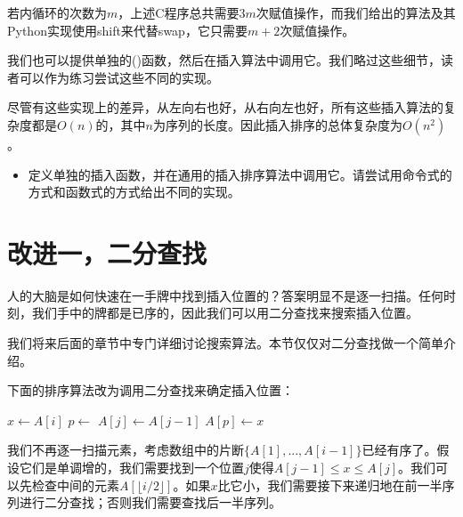 \documentclass[UTF8]{article}
\begin{document}
若内循环的次数为$m$，上述C程序总共需要$3m$次赋值操作，而我们给出的算法及其Python实现使用shift来代替swap，它只需要$m+2$次赋值操作。

我们也可以提供单独的()函数，然后在插入算法中调用它。我们略过这些细节，读者可以作为练习尝试这些不同的实现。

尽管有这些实现上的差异，从左向右也好，从右向左也好，所有这些插入算法的复杂度都是$O(n)$的，其中$n$为序列的长度。因此插入排序的总体复杂度为$O(n^2)$。

\begin{Exercise}

\begin{itemize}
\item 定义单独的插入函数，并在通用的插入排序算法中调用它。请尝试用命令式的方式和函数式的方式给出不同的实现。
\end{itemize}

\end{Exercise}


\section{改进一，二分查找}

人的大脑是如何快速在一手牌中找到插入位置的？答案明显不是逐一扫描。任何时刻，我们手中的牌都是已序的，因此我们可以用二分查找来搜索插入位置。

我们将来后面的章节中专门详细讨论搜索算法。本节仅仅对二分查找做一个简单介绍。

下面的排序算法改为调用二分查找来确定插入位置：

\begin{algorithmic}[1]
    \State $x \gets A[i]$
    \State $p \gets $ 
      \State $A[j] \gets A[j-1]$
    \EndFor
    \State $A[p] \gets x$
  \EndFor
\EndFunction
\end{algorithmic}

我们不再逐一扫描元素，考虑数组中的片断$\{A[1], ..., A[i-1] \}$已经有序了。假设它们是单调增的，我们需要找到一个位置$j$使得$A[j-1] \leq x \leq A[j]$。我们可以先检查中间的元素$A[\lfloor i/2 \rfloor]$。如果$x$比它小，我们需要接下来递归地在前一半序列进行二分查找；否则我们需要查找后一半序列。
\end{document}

